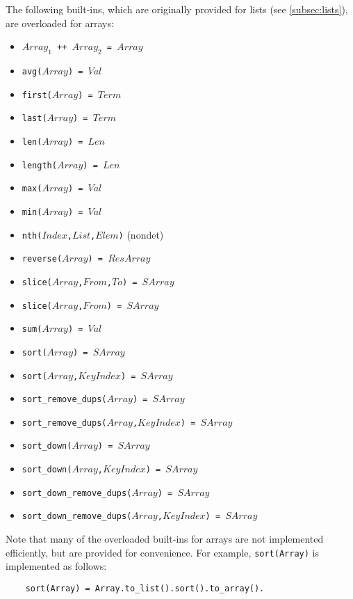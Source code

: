 The following built-ins, which are originally provided for lists (see \ref{subsec:lists}), are overloaded for arrays:
\begin{itemize}
\item \texttt{$Array_1$ ++ $Array_2$ = $Array$}
\item \texttt{avg($Array$) = $Val$}
\item \texttt{first($Array$) = $Term$}
\item \texttt{last($Array$) = $Term$}
\item \texttt{len($Array$) = $Len$}
\item \texttt{length($Array$) = $Len$}
\item \texttt{max($Array$) = $Val$}
\item \texttt{min($Array$) = $Val$}
\item \texttt{nth($Index$,$List$,$Elem$)} (nondet)
\item \texttt{reverse($Array$) = $ResArray$}
\item \texttt{slice($Array$,$From$,$To$) = $SArray$}
\item \texttt{slice($Array$,$From$) = $SArray$}
\item \texttt{sum($Array$) = $Val$}
\item \texttt{sort($Array$) = $SArray$}
\item \texttt{sort($Array$,$KeyIndex$) = $SArray$}
\item \texttt{sort\_remove\_dups($Array$) = $SArray$}
\item \texttt{sort\_remove\_dups($Array$,$KeyIndex$) = $SArray$}
\item \texttt{sort\_down($Array$) = $SArray$}
\item \texttt{sort\_down($Array$,$KeyIndex$) = $SArray$}
\item \texttt{sort\_down\_remove\_dups($Array$) = $SArray$}
\item \texttt{sort\_down\_remove\_dups($Array$,$KeyIndex$) = $SArray$}
\end{itemize}
Note that many of the overloaded built-ins for arrays are not implemented efficiently, but are provided for convenience. For example, \texttt{sort(Array)} is implemented as follows:
\begin{verbatim}
    sort(Array) = Array.to_list().sort().to_array().
\end{verbatim}

